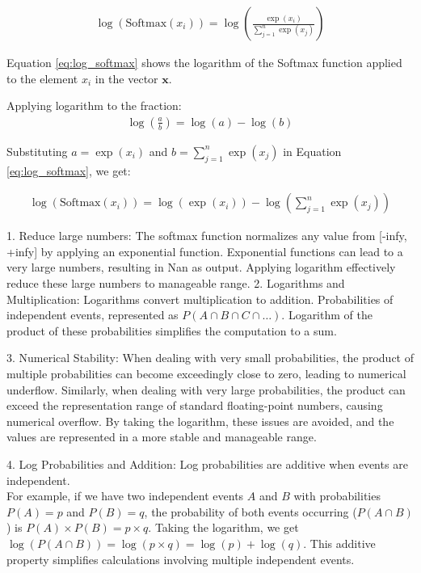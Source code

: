  

\begin{align}
    \log(\text{Softmax}(x_i)) = \log\left(\frac{{\exp(x_i)}}{{\sum_{j=1}^n \exp(x_j)}}\right) \label{eq:log_softmax}
\end{align}

Equation \eqref{eq:log_softmax} shows the logarithm of the Softmax function applied to the element \(x_i\) in the vector \(\mathbf{x}\). 

Applying logarithm to the fraction: 
\begin{align}
    \log\left(\frac{a}{b}\right) = \log(a) - \log(b)
\end{align}

Substituting \(a = \exp(x_i)\) and \(b = \sum_{j=1}^n \exp(x_j)\) in Equation \eqref{eq:log_softmax}, we get:

\begin{align}
    \log(\text{Softmax}(x_i)) = \log(\exp(x_i)) - \log\left(\sum_{j=1}^n \exp(x_j)\right)
\end{align}

1. Reduce large numbers:  The softmax function normalizes any value from [-infy, +infy] by applying an exponential function. Exponential functions can lead to a very large numbers, resulting in  Nan as output. Applying logarithm effectively reduce these large numbers to manageable range.
2. Logarithms and Multiplication: Logarithms convert multiplication to addition. Probabilities of independent events,  represented as \(P(A \cap B \cap C \cap \ldots)\). Logarithm of the product of these probabilities simplifies the computation to a sum. 

3. Numerical Stability: When dealing with very small probabilities, the product of multiple probabilities can become exceedingly close to zero, leading to numerical underflow. Similarly, when dealing with very large probabilities, the product can exceed the representation range of standard floating-point numbers, causing numerical overflow. By taking the logarithm, these issues are avoided, and the values are represented in a more stable and manageable range.

4. Log Probabilities and Addition: Log probabilities are additive when events are independent.\\ For example, if we have two independent events \(A\) and \(B\) with probabilities \(P(A) = p\) and \(P(B) = q\), the probability of both events occurring (\(P(A \cap B)\)) is \(P(A) \times P(B) = p \times q\). Taking the logarithm, we get \(\log(P(A \cap B)) = \log(p \times q) = \log(p) + \log(q)\). This additive property simplifies calculations involving multiple independent events.


